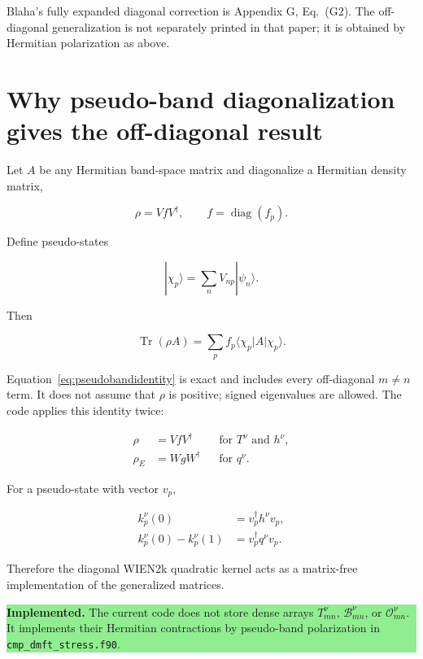 \documentclass[11pt]{article}
\numberwithin{equation}{section}
\newcommand{\Tr}{\operatorname{Tr}}
\newcommand{\diag}{\operatorname{diag}}
\newcommand{\code}[1]{\texttt{#1}}
\newcommand{\status}[2]{\par\medskip\noindent\colorbox{#1}{\parbox{0.965\linewidth}{#2}}\par\medskip}
\newcommand{\implemented}[1]{\status{lightgreen}{\textbf{Implemented.} #1}}
\begin{document}
Blaha's fully expanded diagonal correction is Appendix G, Eq.~(G2).  The
off-diagonal generalization is not separately printed in that paper; it is
obtained by Hermitian polarization as above.

\section{Why pseudo-band diagonalization gives the off-diagonal result}

Let $A$ be any Hermitian band-space matrix and diagonalize a Hermitian density
matrix,

\begin{equation}
 \rho=VfV^\dagger,\qquad f=\diag(f_p).
\end{equation}

Define pseudo-states

\begin{equation}
 |\chi_p\rangle=\sum_nV_{np}|\psi_n\rangle.
\end{equation}

Then

\begin{equation}
 \Tr(\rho A)=\sum_pf_p\langle\chi_p|A|\chi_p\rangle.
 \label{eq:pseudobandidentity}
\end{equation}

Equation~\eqref{eq:pseudobandidentity} is exact and includes every
off-diagonal $m\ne n$ term.  It does not assume that $\rho$ is positive;
signed eigenvalues are allowed.  The code applies this identity twice:

\begin{align}
 \rho&=VfV^\dagger &&\text{for }T^\nu\text{ and }h^\nu,\\
 \rho_E&=WgW^\dagger &&\text{for }q^\nu.
\end{align}

For a pseudo-state with vector $v_p$,

\begin{align}
 k_p^\nu(0)&=v_p^\dagger h^\nu v_p,\\
 k_p^\nu(0)-k_p^\nu(1)&=v_p^\dagger q^\nu v_p.
\end{align}

Therefore the diagonal WIEN2k quadratic kernel acts as a matrix-free
implementation of the generalized matrices.

\implemented{The current code does not store dense arrays $T^\nu_{mn}$,
$\mathcal B^\nu_{mn}$, or $\mathcal O^\nu_{mn}$.  It implements their Hermitian
contractions by pseudo-band polarization in \code{cmp\_dmft\_stress.f90}.}
\end{document}
